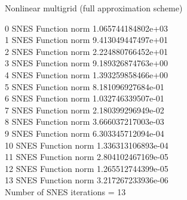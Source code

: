 \begin{frame}{Nonlinear multigrid (full approximation scheme)}
\begin{itemize}
{{  0 SNES Function norm 1.065744184802e+03 \\
  1 SNES Function norm 9.413049447497e+01 \\
  2 SNES Function norm 2.224880766452e+01 \\
  3 SNES Function norm 9.189326874763e+00 \\
  4 SNES Function norm 1.393259858466e+00 \\
  5 SNES Function norm 8.181096927684e-01 \\
  6 SNES Function norm 1.032746339507e-01 \\
  7 SNES Function norm 2.180399296949e-02 \\
  8 SNES Function norm 3.666037217003e-03 \\
  9 SNES Function norm 6.303345712094e-04 \\
 10 SNES Function norm 1.336313106893e-04 \\
 11 SNES Function norm 2.804102467169e-05 \\
 12 SNES Function norm 1.265512744399e-05 \\
 13 SNES Function norm 3.217267233936e-06 \\
Number of SNES iterations = 13
}}
  \end{itemize}
\end{frame}
